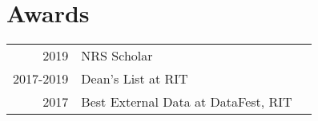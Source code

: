 \documentclass[]{deedy-resume-openfont}
\begin{document}
\begin{minipage}[t]{0.67\textwidth}



%
%


\section{Awards}
\begin{tabular}{rll}
2019         & NRS Scholar \\
2017-2019	   & Dean's List at RIT \\
2017	       & Best External Data at DataFest, RIT \\
\end{tabular}
\sectionsep

\sectionsep

\end{minipage}
\end{document}
